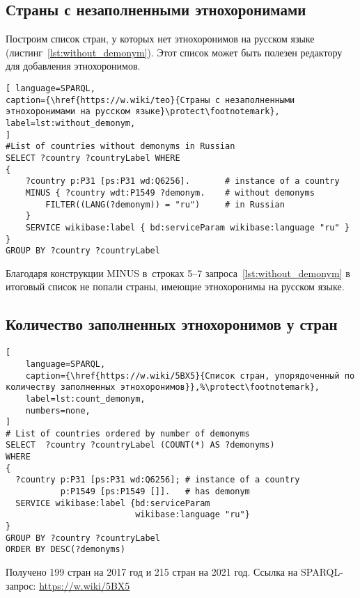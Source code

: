 



\newpage
\subsection{Страны с незаполненными этнохоронимами}

Построим список стран, у которых нет этнохоронимов на русском языке (листинг~\ref{lst:without_demonym}). 
Этот список может быть полезен редактору для добавления этнохоронимов. 


\begin{lstlisting}[ language=SPARQL, 
caption={\href{https://w.wiki/teo}{Страны с незаполненными этнохоронимами на русском языке}\protect\footnotemark},
label=lst:without_demonym, 
]
#List of countries without demonyms in Russian
SELECT ?country ?countryLabel WHERE
{
	?country p:P31 [ps:P31 wd:Q6256].       # instance of a country
	MINUS { ?country wdt:P1549 ?demonym.    # without demonyms
        FILTER((LANG(?demonym)) = "ru")     # in Russian
	}
	SERVICE wikibase:label { bd:serviceParam wikibase:language "ru" }
}
GROUP BY ?country ?countryLabel
\end{lstlisting}

Благодаря конструкции MINUS в~строках 5--7 запроса~\ref{lst:without_demonym} 
в итоговый список не попали страны, имеющие этнохоронимы на русском языке.





\subsection{Количество заполненных этнохоронимов у стран}
%
\begin{marginfigure}[-5\baselineskip]
\begin{lstlisting}[ 
    language=SPARQL, 
    caption={\href{https://w.wiki/5BX5}{Список стран, упорядоченный по количеству заполненных этнохоронимов}},%\protect\footnotemark},
    label=lst:count_demonym, 
    numbers=none,
]
# List of countries ordered by number of demonyms
SELECT  ?country ?countryLabel (COUNT(*) AS ?demonyms) 
WHERE
{
  ?country p:P31 [ps:P31 wd:Q6256]; # instance of a country
           p:P1549 [ps:P1549 []].   # has demonym
  SERVICE wikibase:label {bd:serviceParam 
                          wikibase:language "ru"}
}
GROUP BY ?country ?countryLabel 
ORDER BY DESC(?demonyms)
\end{lstlisting}
Получено 199 стран на 2017 год и 215 стран на 2021 год. Ссылка на SPARQL-запрос: \href{https://w.wiki/5BX5}{https://w.wiki/5BX5}
\end{marginfigure}%


